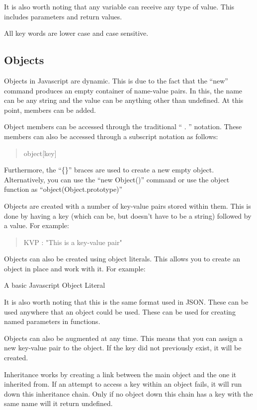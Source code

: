 			It is also worth noting that any variable can receive any type of value. 
			This includes parameters and return values. 
			
			All key words are lower case and case sensitive. 
		\subsection{Objects}
			Objects in Javascript are dynamic. 
			This is due to the fact that the ``new'' command produces an empty container of name-value pairs.
			In this, the name can be any string and the value can be anything other than undefined. 
			At this point, members can be added. 
			
			Object members can be accessed through the traditional `` . '' notation. 
			These members can also be accessed through a subscript notation as follows:
			\begin{quote}
				object[key]
			\end{quote}
			Furthermore, the ``\{\}'' braces are used to create a new empty object. 
			Alternatively, you can use the ``new Object()'' command or 
			use the object function as ``object(Object.prototype)''

			Objects are created with a number of key-value pairs stored within them. 
			This is done by having a key (which can be, but doesn't have to be a string) followed by a value. 
			For example:
			\begin{quote}
				KVP : "This is a key-value pair"
			\end{quote}
			 
			Objects can also be created using object literals. 
			This allows you to create an object in place and work with it.
			For example:
			\begin{code}
				
				\caption{A basic Javascript Object Literal}
				\label{code:JSObjectLiteral}
			\end{code}
			It is also worth noting that this is the same format used in JSON. 
			These can be used anywhere that an object could be used. 
			These can be used for creating named parameters in functions. 

			Objects can also be augmented at any time. 
			This means that you can assign a new key-value pair to the object. 
			If the key did not previously exist, it will be created. 

			Inheritance works by creating a link between the main object and the one it inherited from. 
			If an attempt to access a key within an object fails, it will run down this inheritance chain. 
			Only if no object down this chain has a key with the same name will it return undefined. 
			
